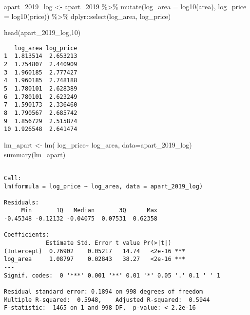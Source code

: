 \documentclass[
  11pt,
  a4paper,
  oneside]{scrbook}
\newenvironment{Shaded}{\begin{snugshade}}{\end{snugshade}}
\newcommand{\AttributeTok}[1]{\textcolor[rgb]{0.40,0.45,0.13}{#1}}
\newcommand{\DecValTok}[1]{\textcolor[rgb]{0.68,0.00,0.00}{#1}}
\newcommand{\FunctionTok}[1]{\textcolor[rgb]{0.28,0.35,0.67}{#1}}
\newcommand{\NormalTok}[1]{\textcolor[rgb]{0.00,0.23,0.31}{#1}}
\newcommand{\OtherTok}[1]{\textcolor[rgb]{0.00,0.23,0.31}{#1}}
\newcommand{\SpecialCharTok}[1]{\textcolor[rgb]{0.37,0.37,0.37}{#1}}
\theoremstyle{definition}
\theoremstyle{plain}
\theoremstyle{definition}
\theoremstyle{definition}
\theoremstyle{remark}
\begin{document}
\begin{Shaded}
\begin{Highlighting}[]
\NormalTok{apart\_2019\_log }\OtherTok{\textless{}{-}}\NormalTok{ apart\_2019 }\SpecialCharTok{\%\textgreater{}\%} 
  \FunctionTok{mutate}\NormalTok{(}\AttributeTok{log\_area =} \FunctionTok{log10}\NormalTok{(area), }\AttributeTok{log\_price =} \FunctionTok{log10}\NormalTok{(price)) }\SpecialCharTok{\%\textgreater{}\%}
\NormalTok{  dplyr}\SpecialCharTok{::}\FunctionTok{select}\NormalTok{(log\_area, log\_price)}

\FunctionTok{head}\NormalTok{(apart\_2019\_log,}\DecValTok{10}\NormalTok{)}
\end{Highlighting}
\end{Shaded}

\begin{verbatim}
   log_area log_price
1  1.813514  2.653213
2  1.754807  2.440909
3  1.960185  2.777427
4  1.960185  2.748188
5  1.780101  2.628389
6  1.780101  2.623249
7  1.590173  2.336460
8  1.790567  2.685742
9  1.856729  2.515874
10 1.926548  2.641474
\end{verbatim}

\begin{Shaded}
\begin{Highlighting}[]
\NormalTok{lm\_apart }\OtherTok{\textless{}{-}} \FunctionTok{lm}\NormalTok{( log\_price}\SpecialCharTok{\textasciitilde{}}\NormalTok{ log\_area, }\AttributeTok{data=}\NormalTok{apart\_2019\_log)}
\FunctionTok{summary}\NormalTok{(lm\_apart)}
\end{Highlighting}
\end{Shaded}

\begin{verbatim}

Call:
lm(formula = log_price ~ log_area, data = apart_2019_log)

Residuals:
     Min       1Q   Median       3Q      Max 
-0.45348 -0.12132 -0.04075  0.07531  0.62358 

Coefficients:
            Estimate Std. Error t value Pr(>|t|)    
(Intercept)  0.76902    0.05217   14.74   <2e-16 ***
log_area     1.08797    0.02843   38.27   <2e-16 ***
---
Signif. codes:  0 '***' 0.001 '**' 0.01 '*' 0.05 '.' 0.1 ' ' 1

Residual standard error: 0.1894 on 998 degrees of freedom
Multiple R-squared:  0.5948,    Adjusted R-squared:  0.5944 
F-statistic:  1465 on 1 and 998 DF,  p-value: < 2.2e-16
\end{verbatim}
\end{document}
